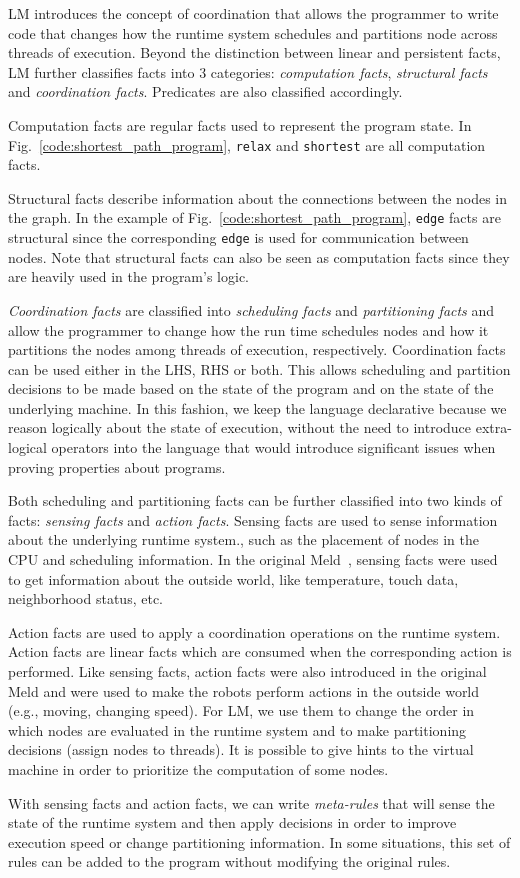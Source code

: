 LM introduces the concept of coordination that allows the programmer to write
code that changes how the runtime system schedules and partitions node across
threads of execution. Beyond the distinction between linear and persistent
facts, LM further classifies facts into 3 categories: \emph{computation facts},
\emph{structural facts} and \emph{coordination facts}.  Predicates are also
classified accordingly.

Computation facts are regular facts used to represent the program state. In
Fig.~\ref{code:shortest_path_program}, \texttt{relax} and \texttt{shortest} are
all computation facts.

Structural facts describe information about the connections between the nodes in
the graph. In the example of Fig.~\ref{code:shortest_path_program},
\texttt{edge} facts are structural since the corresponding \texttt{edge} is used
for communication between nodes.  Note that structural facts can also be seen as
computation facts since they are heavily used in the program's logic.

\emph{Coordination facts} are classified into \emph{scheduling facts} and
\emph{partitioning facts} and allow the programmer to change how the run time
schedules nodes and how it partitions the nodes among threads of execution,
respectively. Coordination facts can be used either in the LHS, RHS or both.
This allows scheduling and partition decisions to be made based on the state of
the program and on the state of the underlying machine.  In this fashion, we
keep the language declarative because we reason logically about the state of
execution, without the need to introduce extra-logical operators into the
language that would introduce significant issues when proving properties about
programs.

Both scheduling and partitioning facts can be further classified into two kinds
of facts: \emph{sensing facts} and \emph{action facts}. Sensing facts are used
to sense information about the underlying runtime system., such as the placement
of nodes in the CPU and scheduling information. In the original
Meld~\cite{ashley-rollman-iclp09}, sensing facts were used to get information
about the outside world, like temperature, touch data, neighborhood status, etc.

Action facts are used to apply a coordination operations on the runtime system.
Action facts are linear facts which are consumed when the corresponding action
is performed. Like sensing facts, action facts were also introduced in the
original Meld and were used to make the robots perform actions in the outside
world (e.g., moving, changing speed). For LM, we use them to change the order in which
nodes are evaluated in the runtime system and to make partitioning decisions
(assign nodes to threads). It is possible to give hints to the virtual machine
in order to prioritize the computation of some nodes.

With sensing facts and action facts, we can write \emph{meta-rules} that will
sense the state of the runtime system and then apply decisions in order to
improve execution speed or change partitioning information. In some situations,
this set of rules can be added to the program without modifying the original
rules.

